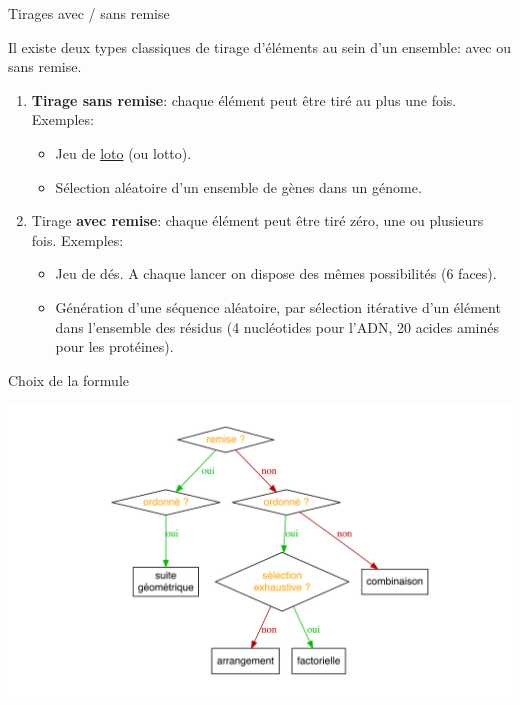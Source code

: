 \documentclass[ignorenonframetext,]{beamer}
\providecommand{\tightlist}{%
  \setlength{\itemsep}{0pt}\setlength{\parskip}{0pt}}
\begin{document}
\begin{frame}{Tirages avec / sans remise}
\protect\hypertarget{tirages-avec-sans-remise}{}

Il existe deux types classiques de tirage d'éléments au sein d'un
ensemble: avec ou sans remise.

\begin{enumerate}
\item
  \textbf{Tirage sans remise}: chaque élément peut être tiré au plus une
  fois. Exemples:

  \begin{itemize}
  \tightlist
  \item
    Jeu de \href{https://fr.wikipedia.org/wiki/Loto}{loto} (ou lotto).
  \item
    Sélection aléatoire d'un ensemble de gènes dans un génome.
  \end{itemize}
\item
  Tirage \textbf{avec remise}: chaque élément peut être tiré zéro, une
  ou plusieurs fois. Exemples:

  \begin{itemize}
  \tightlist
  \item
    Jeu de dés. A chaque lancer on dispose des mêmes possibilités (6
    faces).
  \item
    Génération d'une séquence aléatoire, par sélection itérative d'un
    élément dans l'ensemble des résidus (4 nucléotides pour l'ADN, 20
    acides aminés pour les protéines).
  \end{itemize}
\end{enumerate}

\end{frame}

\begin{frame}{Choix de la formule}
\protect\hypertarget{choix-de-la-formule}{}

\begin{center}\includegraphics[width=0.9\linewidth]{figures/02_combinatorix_combinatorix_flowchart-1} \end{center}

\end{frame}
\end{document}
